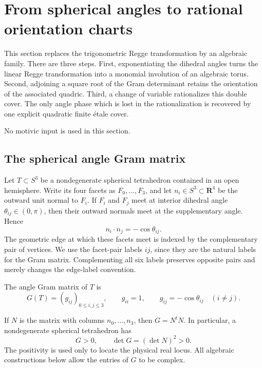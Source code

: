 \section{From spherical angles to rational orientation charts}
\label{cp:sec-phase-charts}

This section replaces the trigonometric Regge transformation by an
algebraic family.  There are three steps.  First, exponentiating the
dihedral angles turns the linear Regge transformation into a monomial
involution of an algebraic torus.  Second, adjoining a square root of the
Gram determinant retains the orientation of the associated quadric.  Third,
a change of variable rationalizes this double cover.  The only angle phase
which is lost in the rationalization is recovered by one explicit quadratic
finite \'etale cover.

No motivic input is used in this section.

\subsection{The spherical angle Gram matrix}
\label{cp:subsec-angle-gram}

Let \(T\subset S^3\) be a nondegenerate spherical tetrahedron contained in
an open hemisphere.  Write its four facets as \(F_0,\ldots,F_3\), and let
\(n_i\in S^3\subset\mathbf R^4\) be the outward unit normal to \(F_i\).
If \(F_i\) and \(F_j\) meet at interior dihedral angle
\(\theta_{ij}\in(0,\pi)\), then their outward normals meet at the
supplementary angle.  Hence
\begin{equation}
 n_i\mathbin{\cdot}n_j=-\cos\theta_{ij}.
 \label{cp:eq-normal-angle}
\end{equation}
The geometric edge at which these facets meet is indexed by the
complementary pair of vertices.  We use the facet-pair labels \(ij\), since
they are the natural labels for the Gram matrix.  Complementing all six
labels preserves opposite pairs and merely changes the edge-label
convention.

\begin{definition}
\label{cp:def-angle-gram}
The angle Gram matrix of \(T\) is
\begin{equation}
 G(T)=(g_{ij})_{0\leq i,j\leq3},\qquad
 g_{ii}=1,\qquad g_{ij}=-\cos\theta_{ij}\quad(i\ne j).
 \label{cp:eq-angle-gram}
\end{equation}
\end{definition}

If \(N\) is the matrix with columns \(n_0,\ldots,n_3\), then
\(G=N^tN\).  In particular, a nondegenerate spherical tetrahedron has
\begin{equation}
 G>0,\qquad \det G=(\det N)^2>0.
 \label{cp:eq-spherical-gram-positive}
\end{equation}
The positivity is used only to locate the physical real locus.  All
algebraic constructions below allow the entries of \(G\) to be complex.

